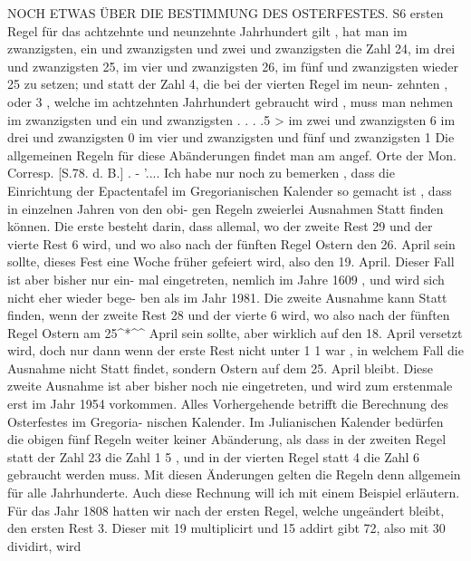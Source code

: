 \documentclass[12pt,a4paper]{article}
\begin{document}
\newpage

NOCH  ETWAS  ÜBER  DIE  BESTIMMUNG  DES  OSTERFESTES.  S6
ersten  Regel  für  das  achtzehnte  und  neunzehnte  Jahrhundert  gilt ,  hat  man  im
zwanzigsten,  ein  und  zwanzigsten  und  zwei  und  zwanzigsten  die  Zahl  24,  im
drei  und  zwanzigsten  25,  im  vier  und  zwanzigsten  26,  im  fünf  und  zwanzigsten
wieder  25  zu  setzen;  und  statt  der  Zahl  4,  die  bei  der  vierten  Regel  im  neun-
zehnten ,  oder  3 ,  welche  im  achtzehnten  Jahrhundert  gebraucht  wird ,  muss
man  nehmen
im  zwanzigsten  und  ein  und  zwanzigsten     .     .     .     .5  >
im  zwei  und  zwanzigsten
6
im  drei  und  zwanzigsten
0
im  vier  und  zwanzigsten  und  fünf  und  zwanzigsten         1
Die  allgemeinen  Regeln  für  diese  Abänderungen  findet  man  am  angef.  Orte
der  Mon.  Corresp.     [S.78.  d.  B.]  .       -  '....
Ich  habe  nur  noch  zu  bemerken ,  dass  die  Einrichtung  der  Epactentafel  im
Gregorianischen  Kalender  so  gemacht  ist ,  dass  in  einzelnen  Jahren  von  den  obi-
gen Regeln  zweierlei  Ausnahmen  Statt  finden  können.  Die  erste  besteht  darin,
dass  allemal,  wo  der  zweite  Rest  29  und  der  vierte  Rest  6  wird,  und  wo  also
nach  der  fünften  Regel  Ostern  den  26.  April  sein  sollte,  dieses  Fest  eine  Woche
früher  gefeiert  wird,  also  den  19.  April.  Dieser  Fall  ist  aber  bisher  nur  ein-
mal eingetreten,  nemlich  im  Jahre  1609  ,  und  wird  sich  nicht  eher  wieder  bege-
ben als  im  Jahr  1981.  Die  zweite  Ausnahme  kann  Statt  finden,  wenn  der  zweite
Rest  28  und  der  vierte  6  wird,  wo  also  nach  der  fünften  Regel  Ostern  am  25\^{}*\^{}\^{}
April  sein  sollte,  aber  wirklich  auf  den  18.  April  versetzt  wird,  doch  nur  dann
wenn  der  erste  Rest  nicht  unter  1 1  war ,  in  welchem  Fall  die  Ausnahme  nicht
Statt  findet,  sondern  Ostern  auf  dem  25.  April  bleibt.  Diese  zweite  Ausnahme
ist  aber  bisher  noch  nie  eingetreten,  und  wird  zum  erstenmale  erst  im  Jahr  1954
vorkommen.
Alles  Vorhergehende  betrifft  die  Berechnung  des  Osterfestes  im  Gregoria-
nischen Kalender.  Im  Julianischen  Kalender  bedürfen  die  obigen  fünf  Regeln
weiter  keiner  Abänderung,  als  dass  in  der  zweiten  Regel  statt  der  Zahl  23  die
Zahl  1 5 ,  und  in  der  vierten  Regel  statt  4  die  Zahl  6  gebraucht  werden  muss.
Mit  diesen  Änderungen  gelten  die  Regeln  denn  allgemein  für  alle  Jahrhunderte.
Auch  diese  Rechnung  will  ich  mit  einem  Beispiel  erläutern.  Für  das  Jahr  1808
hatten  wir  nach  der  ersten  Regel,  welche  ungeändert  bleibt,  den  ersten  Rest  3.
Dieser  mit   19  multiplicirt  und   15  addirt  gibt  72,  also  mit   30  dividirt,  wird
\end{document}
